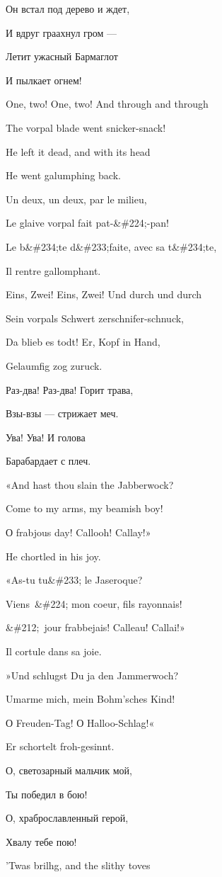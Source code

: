 \documentclass[../main.tex]{subfiles}
\begin{document}
Он встал под дерево и ждет,

И вдруг граахнул гром ---

Летит ужасный Бармаглот

И пылкает огнем!

One, two! One, two! And through and through

The vorpal blade went snicker-snack!

He left it dead, and with its head

He went galumphing back.

Un deux, un deux, par le milieu,

Le glaive vorpal fait pat-\&\#224;-pan!

Le b\&\#234;te d\&\#233;faite, avec sa t\&\#234;te,

Il rentre gallomphant.

Eins, Zwei! Eins, Zwei! Und durch und durch

Sein vorpals Schwert zerschnifer-schnuck,

Da blieb es todt! Er, Kopf in Hand,

Gelaumfig zog zuruck.

Раз-два! Раз-два! Горит трава,

Взы-взы --- стрижает меч.

Ува! Ува! И голова

Барабардает с плеч.

«And hast thou slain the Jabberwock?

Come to my arms, my beamish boy!

О frabjous day! Callooh! Callay!»

He chortled in his joy.

«As-tu tu\&\#233; le Jaseroque?

Viens~\&\#224; mon coeur, fils rayonnais!

\&\#212;~jour frabbejais! Calleau! Callai!»

Il cortule dans sa joie.

»Und schlugst Du ja den Jammerwoch?

Umarme mich, mein Bohm'sches Kind!

О Freuden-Tag! О Halloo-Schlag!«

Er schortelt froh-gesinnt.

О, светозарный мальчик мой,

Ты победил в бою!

О, храброславленный герой,

Хвалу тебе пою!

'Twas brilhg, and the slithy toves
\end{document}
